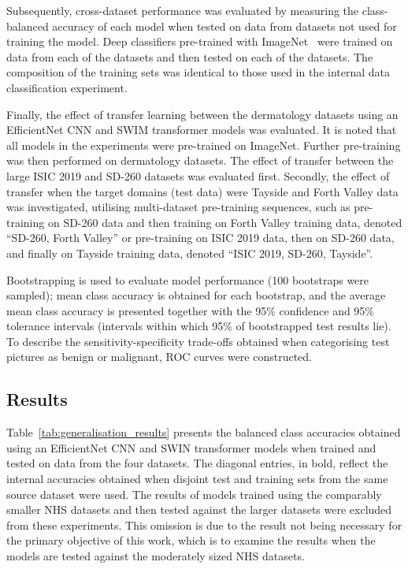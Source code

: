 Subsequently, cross-dataset performance was evaluated by measuring the class-balanced accuracy of each model when tested on data from datasets not used for training the model. Deep classifiers pre-trained with ImageNet~\citep{deng2009imagenet} were trained on data from each of the datasets and then tested on each of the datasets. The composition of the training sets was identical to those used in the internal data classification experiment.

Finally, the effect of transfer learning between the dermatology datasets using an EfficientNet CNN and SWIM transformer models was evaluated. It is noted that all models in the experiments were pre-trained on ImageNet. Further pre-training was then performed on dermatology datasets. The effect of transfer between the large ISIC 2019 and SD-260 datasets was evaluated first. Secondly, the effect of transfer when the target domains (test data) were Tayside and Forth Valley data was investigated, utilising multi-dataset pre-training sequences, such as pre-training on SD-260 data and then training on Forth Valley training data, denoted “SD-260, Forth Valley” or pre-training on ISIC 2019 data, then on SD-260 data, and finally on Tayside training data, denoted “ISIC 2019, SD-260, Tayside”.

Bootstrapping is used to evaluate model performance (100 bootstraps were sampled); mean class accuracy is obtained for each bootstrap, and the average mean class accuracy is presented together with the 95\% confidence and 95\% tolerance intervals (intervals within which 95\% of bootstrapped test results lie). To describe the sensitivity-specificity trade-offs obtained when categorising test pictures as benign or malignant, ROC curves were constructed.


\subsection{Results}
\label{subsec:generalisation_results}
Table~\ref{tab:generalisation_results} presents the balanced class accuracies obtained using an EfficientNet CNN and SWIN transformer models when trained and tested on data from the four datasets. The diagonal entries, in bold, reflect the internal accuracies obtained when disjoint test and training sets from the same source dataset were used. The results of models trained using the comparably smaller NHS datasets and then tested against the larger datasets were excluded from these experiments. This omission is due to the result not being necessary for the primary objective of this work, which is to examine the results when the models are tested against the moderately sized NHS datasets.

